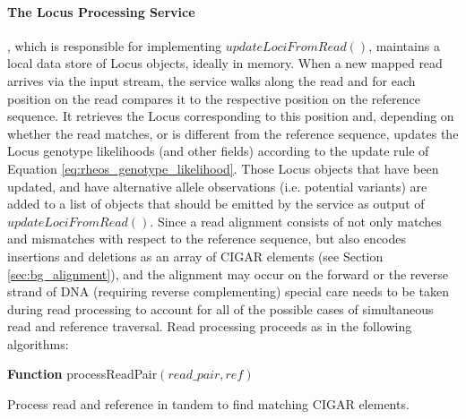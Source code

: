 \paragraph{The Locus Processing Service}, which is responsible for implementing $updateLociFromRead()$, maintains a local data store of Locus objects, ideally in memory. When a new mapped read arrives via the input stream, the service walks along the read and for each position on the read compares it to the respective position on the reference sequence. It retrieves the Locus corresponding to this position and, depending on whether the read matches, or is different from the reference sequence, updates the Locus genotype likelihoods (and other fields) according to the update rule of Equation \ref{eq:rheos_genotype_likelihood}. Those Locus objects that have been updated, and have alternative allele observations (i.e. potential variants) are added to a list of objects that should be emitted by the service as output of $updateLociFromRead()$. Since a read alignment consists of not only matches and mismatches with respect to the reference sequence, but also encodes insertions and deletions as an array of CIGAR elements (see Section \ref{sec:bg_alignment}), and the alignment may occur on the forward or the reverse strand of DNA (requiring reverse complementing) special care needs to be taken during read processing to account for all of the possible cases of simultaneous read and reference traversal. Read processing proceeds as in the following algorithms:

\begin{algorithm2e}[h]
    \DontPrintSemicolon
    \footnotesize
    \textbf{Function} {\sc processReadPair}$(read\_pair, ref)$
    \caption{Process read and reference in tandem to find matching CIGAR elements.}\label{ag:process_read_pair}
\end{algorithm2e}

